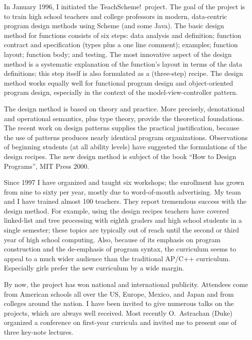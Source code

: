 

In January 1996, I initiated the TeachScheme!\ project. The goal of the
project is to train high school teachers and college professors in modern,
data-centric program design methods using Scheme (and some Java). The basic
design method for functions consists of six steps: data analysis and
definition; function contract and specification (types plus a one line
comment); examples; function layout; function body; and testing. The most
innovative aspect of the design method is a systematic explanation of the
function's layout in terms of the data definitions; this step itself is
also formulated as a (three-step) recipe. The design method works equally
well for functional program design and object-oriented program design,
especially in the context of the model-view-controller pattern.

The design method is based on theory and practice. More precisely,
denotational and operational semantics, plus type theory, provide the
theoretical foundations. The recent work on design patterns supplies the
practical justification, because the use of patterns produces nearly
identical program organizations.  Observations of beginning students (at
all ability levels) have suggested the formulations of the design
recipes. The new design method is subject of the book ``How to Design
Programs'', MIT Press 2000. 

Since 1997 I have organized and taught six workshops; the enrollment has
grown from nine to sixty per year, mostly due to word-of-mouth
advertising. My team and I have trained almost 100 teachers. They report
tremendous success with the design method. For example, using the design
recipes teachers have covered linked-list and tree processing with eighth
graders and high school students in a single semester; these topics are
typically out of reach until the second or third year of high school
computing.  Also, because of its emphasis on program construction and the
de-emphasis of program syntax, the curriculum seems to appeal to a much
wider audience than the traditional AP/C++ curriculum. Especially girls
prefer the new curriculum by a wide margin.

By now, the project has won national and international publicity.
Attendees come from American schools all over the US, Europe, Mexico, and
Japan and from colleges around the nation. I have been invited to give
numerous talks on the projects, which are always well received.  Most
recently O.\ Astrachan (Duke) organized a conference on first-year
curricula and invited me to present one of three key-note lectures. 

